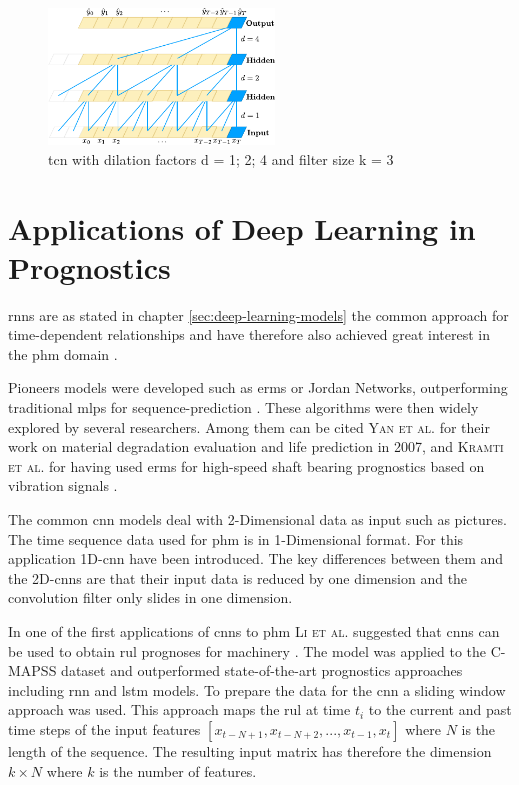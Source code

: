 \documentclass[conference]{IEEEtran}
\begin{document}
\begin{figure}[htp]
	\centering
	\includegraphics[width=6cm]{tcn_architecture.pdf}
	\caption{\gls{tcn} with dilation factors d = 1; 2; 4 and filter size k = 3 \cite{Bai2018}}
	\label{fig:tcn-architecture}
\end{figure}

\section{Applications of Deep Learning in Prognostics}
\label{sec:applications-of-deep-learning-in-prognostics}

\glspl{rnn} are as stated in chapter \ref{sec:deep-learning-models} the common approach for time-dependent relationships and have therefore also achieved great interest in the \gls{phm} domain \cite{Akrim2021}.


Pioneers models were developed such as \glspl{erm} or Jordan Networks, outperforming traditional \glspl{mlp} for sequence-prediction \cite{Akrim2021}. These algorithms were then widely explored by several researchers. Among them can be cited \textsc{Yan et al.} for their work on material degradation evaluation and life prediction in 2007, and \textsc{Kramti et al.} for having used \glspl{erm} for high-speed shaft bearing prognostics based on vibration signals \cite{Akrim2021}.

The common \gls{cnn} models deal with 2-Dimensional data as input such as pictures. The time sequence data used for \gls{phm} is in 1-Dimensional format. For this application 1D-\gls{cnn} have been introduced. The key differences between them and the 2D-\glspl{cnn} are that their input data is reduced by one dimension and the convolution filter only slides in one dimension. \cite{Akrim2021}

In one of the first applications of \glspl{cnn} to \gls{phm} \textsc{Li et al.} suggested that \glspl{cnn} can be used to obtain \gls{rul} prognoses for machinery \cite{Li2018}. The model was applied to the C-MAPSS dataset \cite{Saxena2008} and outperformed state-of-the-art prognostics approaches including \gls{rnn} and \gls{lstm} models. To prepare the data for the \gls{cnn} a sliding window approach was used. This approach maps the \gls{rul} at time $ t_i $ to the current and past time steps of the input features $ [x_{t-N+1}, x_{t-N+2},..., x_{t-1}, x_t] $ where $ N $ is the length of the sequence. The resulting input matrix has therefore the dimension $ k \times N $ where $ k $ is the number of features.
\end{document}
